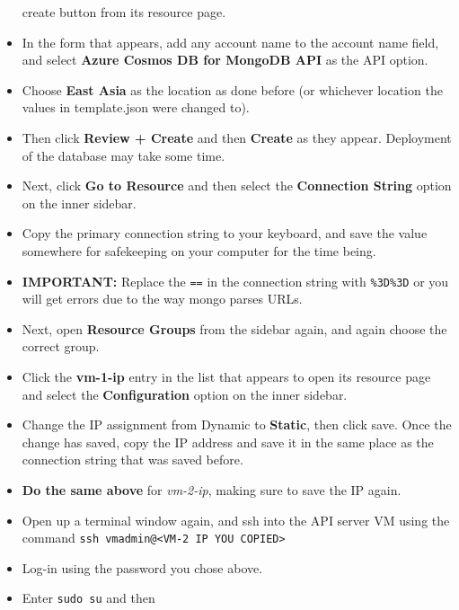 \documentclass[12pt]{extarticle}
\begin{document}
\begin{itemize}
  create button from its resource page.
\item
  In the form that appears, add any account name to the account name
  field, and select \textbf{Azure Cosmos DB for MongoDB API} as the API
  option.
\item
  Choose \textbf{East Asia} as the location as done before (or whichever
  location the values in template.json were changed to).
\item
  Then click \textbf{Review + Create} and then \textbf{Create} as they
  appear. Deployment of the database may take some time.
\item
  Next, click \textbf{Go to Resource} and then select the
  \textbf{Connection String} option on the inner sidebar.
\item
  Copy the primary connection string to your keyboard, and save the
  value somewhere for safekeeping on your computer for the time being.
\item
  \textbf{IMPORTANT:} Replace the \texttt{==} in the connection string
  with \texttt{\%3D\%3D} or you will get errors due to the way mongo
  parses URLs.
\item
  Next, open \textbf{Resource Groups} from the sidebar again, and again
  choose the correct group.
\item
  Click the \textbf{vm-1-ip} entry in the list that appears to open its
  resource page and select the \textbf{Configuration} option on the
  inner sidebar.
\item
  Change the IP assignment from Dynamic to \textbf{Static}, then click
  save. Once the change has saved, copy the IP address and save it in
  the same place as the connection string that was saved before.
\item
  \textbf{Do the same above} for \emph{vm-2-ip}, making sure to save the
  IP again.
\item
  Open up a terminal window again, and ssh into the API server VM using
  the command
  \texttt{ssh\ vmadmin@<VM-2\ IP\ YOU\ COPIED>}
\item
  Log-in using the password you chose above.
\item
  Enter \texttt{sudo\ su} and then
  

\end{itemize}
\end{document}
